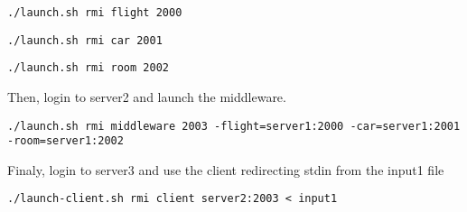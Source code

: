 \documentclass[a4paper]{article}
\begin{document}
{\tt ./launch.sh rmi flight 2000}

{\tt ./launch.sh rmi car 2001}

{\tt ./launch.sh rmi room 2002}

Then, login to server2 and launch the middleware.

{\tt ./launch.sh rmi middleware 2003 -flight=server1:2000 -car=server1:2001 -room=server1:2002}

Finaly, login to server3 and use the client redirecting stdin from the input1 file
 
{\tt ./launch-client.sh rmi client server2:2003 < input1}



%
%
\end{document}
